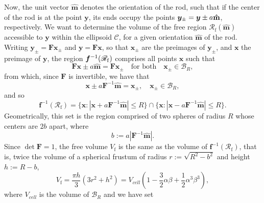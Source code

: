 \documentclass{article}
\begin{document}
Now, the unit vector $\mathbf{\hat{m}}$ denotes the orientation of the rod,
such that if the center of the rod is at the point $\boldsymbol{y}$, its
ends occupy the points $\boldsymbol{y}_{\pm }=\boldsymbol{y}\pm a\mathbf{%
\hat{m}}$, respectively. We want to determine the volume of the free region $%
\mathscr{R}_{\mathrm{f}}(\mathbf{\hat{m}})$ accessible to $\boldsymbol{y}$
within the ellipsoid $\mathcal{C}$, for a given orientation $\mathbf{\hat{m}}
$ of the rod. Writing $\boldsymbol{y}_{\pm }=\mathbf{F}\boldsymbol{x}_{\pm }$
and $\boldsymbol{y}=\mathbf{F}\boldsymbol{x}$, so that $\boldsymbol{x}_{\pm
} $ are the preimages of $\boldsymbol{y}_{\pm }$, and $\boldsymbol{x}$ the
preimage of $\boldsymbol{y}$, the region $\boldsymbol{f}^{-1}(\mathscr{R}_{%
\mathrm{f}})$ comprises all points $\boldsymbol{x}$ such that 
\begin{equation}
\mathbf{F}\boldsymbol{x}\pm a\mathbf{\hat{m}}=\mathbf{F}\boldsymbol{x}_{\pm
}\quad \text{for both}\quad \boldsymbol{x}_{\pm }\in \mathscr{B}_{R},
\label{eq:images}
\end{equation}%
from which, since $\mathbf{F}$ is invertible, we have that 
\begin{equation}
\boldsymbol{x}\pm a\mathbf{F}^{-1}\mathbf{\hat{m}}=\boldsymbol{x}_{\pm
},\quad \boldsymbol{x}_{\pm }\in \mathscr{B}_{R},  \label{eq:preimages}
\end{equation}%
and so 
\begin{equation}
\boldsymbol{f}^{-1}(\mathscr{R}_{\mathrm{f}})=\{\boldsymbol{x}:|\boldsymbol{x%
}+a\mathbf{F}^{-1}\mathbf{\hat{m}}|\leq R\}\cap \{\boldsymbol{x}:|%
\boldsymbol{x}-a\mathbf{F}^{-1}\mathbf{\hat{m}}|\leq R\}.
\label{eq:preregion}
\end{equation}%
Geometrically, this set is the region comprised of two spheres of radius $R$
whose centers are $2b$ apart, where 
\begin{equation}
b:=a|\mathbf{F}^{-1}\mathbf{\hat{m}}|.  \label{eq:b_definition}
\end{equation}%
Since $\det \mathbf{F}=1$, the free volume $V_{\mathrm{f}}$ is the same as
the volume of $\boldsymbol{f}^{-1}(\mathscr{R}_{\mathrm{f}})$, that is,
twice the volume of a spherical frustum of radius $r:=\sqrt{R^{2}-b^{2}}$
and height $h:=R-b$, 
\begin{equation}
V_{\mathrm{f}}=\frac{\pi h}{3}(3r^{2}+h^{2})=V_{cell}\left( 1-\frac{3}{2}%
\alpha \beta +\frac{1}{2}\alpha ^{3}\beta ^{3}\right) ,
\label{eq:free_volume}
\end{equation}%
where $V_{cell}$ is the volume of $\mathscr{B}_{R}$ and we have set 
\end{document}
